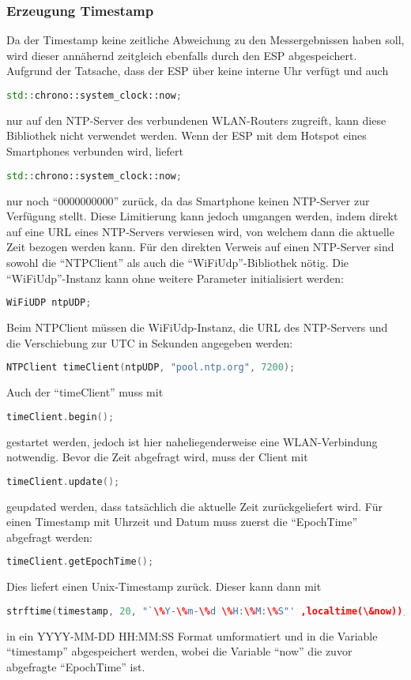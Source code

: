 \subsubsection{Erzeugung Timestamp}
	Da der Timestamp keine zeitliche Abweichung zu den Messergebnissen haben soll, wird dieser annähernd zeitgleich ebenfalls durch den ESP abgespeichert.
	Aufgrund der Tatsache, dass der ESP über keine interne Uhr verfügt und auch 
\begin{lstlisting}[language=C++]
	std::chrono::system_clock::now;
\end{lstlisting}
	nur auf den NTP-Server des verbundenen WLAN-Routers zugreift, kann diese Bibliothek nicht verwendet werden. Wenn der ESP mit dem Hotspot eines Smartphones verbunden wird, liefert 
\begin{lstlisting}[language=C++]
	std::chrono::system_clock::now;
\end{lstlisting}
	nur noch "`0000000000"' zurück, da das Smartphone keinen NTP-Server zur Verfügung stellt.
	Diese Limitierung kann jedoch umgangen werden, indem direkt auf eine URL eines NTP-Servers verwiesen wird, von welchem dann die aktuelle Zeit bezogen werden kann.
	Für den direkten Verweis auf einen NTP-Server sind sowohl die "`NTPClient"' als auch die "`WiFiUdp"'-Bibliothek nötig.
	Die "`WiFiUdp"'-Instanz kann ohne weitere Parameter initialisiert werden:
\begin{lstlisting}[language=C++]
	WiFiUDP ntpUDP;
\end{lstlisting}
	Beim NTPClient müssen die WiFiUdp-Instanz, die URL des NTP-Servers und die Verschiebung zur UTC in Sekunden angegeben werden: 
\begin{lstlisting}[language=C++]
	NTPClient timeClient(ntpUDP, "pool.ntp.org", 7200);
\end{lstlisting}
	Auch der "`timeClient"' muss mit 
\begin{lstlisting}[language=C++]
	timeClient.begin();
\end{lstlisting}
	gestartet werden, jedoch ist hier naheliegenderweise eine WLAN-Verbindung notwendig.
	Bevor die Zeit abgefragt wird, muss der Client mit 
\begin{lstlisting}[language=C++]
	timeClient.update();
\end{lstlisting}
	geupdated werden, dass tatsächlich die aktuelle Zeit zurückgeliefert wird.
	Für einen Timestamp mit Uhrzeit und Datum muss zuerst die "`EpochTime"' abgefragt werden:
\begin{lstlisting}[language=C++]
	timeClient.getEpochTime();
\end{lstlisting}
	Dies liefert einen Unix-Timestamp zurück.
	Dieser kann dann mit 
\begin{lstlisting}[language=C++]
	strftime(timestamp, 20, "`\%Y-\%m-\%d \%H:\%M:\%S"' ,localtime(\&now));
\end{lstlisting}
	in ein YYYY-MM-DD HH:MM:SS Format umformatiert und in die Variable "`timestamp"' abgespeichert werden, wobei die Variable "`now"' die zuvor abgefragte "`EpochTime"' ist.
	